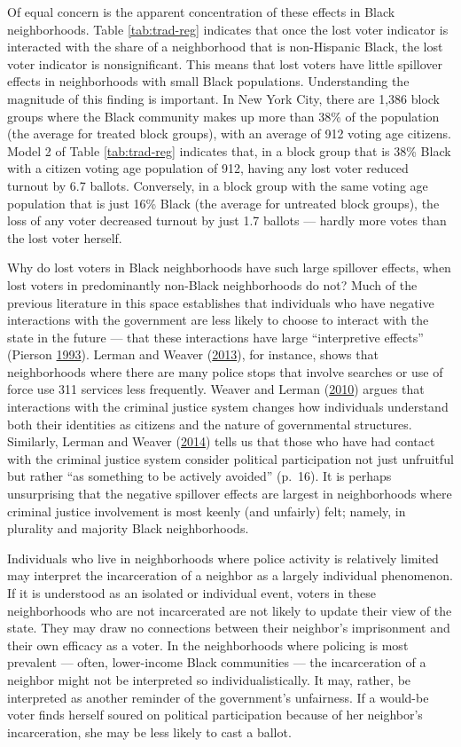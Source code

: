 \documentclass[
  12pt,
]{article}
\begin{document}
Of equal concern is the apparent concentration of these effects in Black neighborhoods. Table \ref{tab:trad-reg} indicates that once the lost voter indicator is interacted with the share of a neighborhood that is non-Hispanic Black, the lost voter indicator is nonsignificant. This means that lost voters have little spillover effects in neighborhoods with small Black populations. Understanding the magnitude of this finding is important. In New York City, there are 1,386 block groups where the Black community makes up more than 38\% of the population (the average for treated block groups), with an average of 912 voting age citizens. Model 2 of Table \ref{tab:trad-reg} indicates that, in a block group that is 38\% Black with a citizen voting age population of 912, having any lost voter reduced turnout by 6.7 ballots. Conversely, in a block group with the same voting age population that is just 16\% Black (the average for untreated block groups), the loss of any voter decreased turnout by just 1.7 ballots --- hardly more votes than the lost voter herself.

Why do lost voters in Black neighborhoods have such large spillover effects, when lost voters in predominantly non-Black neighborhoods do not? Much of the previous literature in this space establishes that individuals who have negative interactions with the government are less likely to choose to interact with the state in the future --- that these interactions have large ``interpretive effects'' (Pierson \protect\hyperlink{ref-Pierson1993}{1993}). Lerman and Weaver (\protect\hyperlink{ref-Lerman2013}{2013}), for instance, shows that neighborhoods where there are many police stops that involve searches or use of force use 311 services less frequently. Weaver and Lerman (\protect\hyperlink{ref-Weaver2010}{2010}) argues that interactions with the criminal justice system changes how individuals understand both their identities as citizens and the nature of governmental structures. Similarly, Lerman and Weaver (\protect\hyperlink{ref-Lerman2014}{2014}) tells us that those who have had contact with the criminal justice system consider political participation not just unfruitful but rather ``as something to be actively avoided'' (p.~16). It is perhaps unsurprising that the negative spillover effects are largest in neighborhoods where criminal justice involvement is most keenly (and unfairly) felt; namely, in plurality and majority Black neighborhoods.

Individuals who live in neighborhoods where police activity is relatively limited may interpret the incarceration of a neighbor as a largely individual phenomenon. If it is understood as an isolated or individual event, voters in these neighborhoods who are not incarcerated are not likely to update their view of the state. They may draw no connections between their neighbor's imprisonment and their own efficacy as a voter. In the neighborhoods where policing is most prevalent --- often, lower-income Black communities --- the incarceration of a neighbor might not be interpreted so individualistically. It may, rather, be interpreted as another reminder of the government's unfairness. If a would-be voter finds herself soured on political participation because of her neighbor's incarceration, she may be less likely to cast a ballot.
\end{document}
